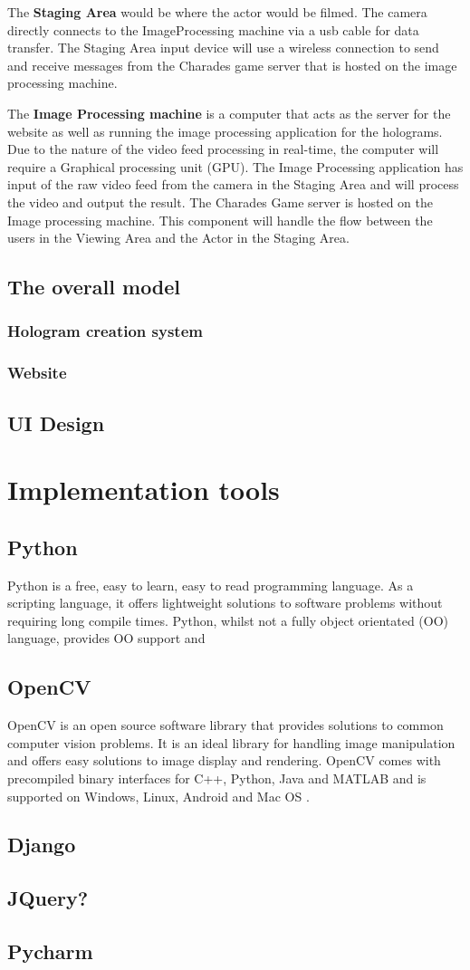 The \textbf{Staging Area} would be where the actor would be filmed. The camera directly connects to the ImageProcessing machine via a usb cable for data transfer. The Staging Area input device will use a wireless connection to send and receive messages from the Charades game server that is hosted on the image processing machine.

The \textbf{Image Processing machine} is a computer that acts as the server for the website as well as running the image processing application for the holograms. Due to the nature of the video feed processing in real-time, the computer will require a Graphical processing unit (GPU). The Image Processing application has input of the raw video feed from the camera in the Staging Area and will process the video and output the result.
The Charades Game server is hosted on the Image processing machine. This component will handle the flow between the users in the Viewing Area and the Actor in the Staging Area.

\subsection{The overall model}
\subsubsection{Hologram creation system}

\subsubsection{Website}

\subsection{UI Design}

\section{Implementation tools}
\subsection{Python}
Python is a free, easy to learn, easy to read programming language. As a scripting language, it offers lightweight solutions to software problems without requiring long compile times. Python, whilst not a fully object orientated (OO) language, provides OO support and 
\subsection{OpenCV}
OpenCV is an open source software library that provides solutions to common computer vision problems. It is an ideal library for handling image manipulation and offers easy solutions to image display and rendering. OpenCV comes with precompiled binary interfaces for C++, Python, Java and MATLAB and is supported on Windows, Linux, Android and Mac OS \cite{open_cv_binaries}. 
\subsection{Django}
\subsection{JQuery?}
\subsection{Pycharm}
